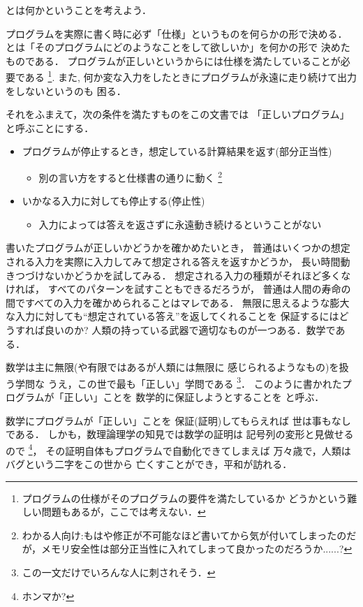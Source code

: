 \documentclass[a4paper, 10pt]{ltjsarticle}
\begin{document}
 とは何かということを考えよう． 

 プログラムを実際に書く時に必ず「仕様」というものを何らかの形で決める．
 とは「そのプログラムにどのようなことをして欲しいか」を何かの形で
 決めたものである．
 プログラムが正しいというからには仕様を満たしていることが必要である
 \footnote{プログラムの仕様がそのプログラムの要件を満たしているか
 どうかという難しい問題もあるが，ここでは考えない．}.
 また, 何か変な入力をしたときにプログラムが永遠に走り続けて出力をしないというのも
 困る．

 それをふまえて，次の条件を満たすものをこの文書では
 「正しいプログラム」と呼ぶことにする．
 
 \begin{itemize}
  \item プログラムが停止するとき，想定している計算結果を返す(部分正当性)
 	\begin{itemize}
 	 \item 別の言い方をすると仕様書の通りに動く
	       \footnote{わかる人向け:もはや修正が不可能なほど書いてから気が付いてしまったのだが，メモリ安全性は部分正当性に入れてしまって良かったのだろうか......?}
 	\end{itemize}
  \item いかなる入力に対しても停止する(停止性)
 	\begin{itemize}
 	 \item 入力によっては答えを返さずに永遠動き続けるということがない
 	\end{itemize}
 \end{itemize}

 書いたプログラムが正しいかどうかを確かめたいとき，
 普通はいくつかの想定される入力を実際に入力してみて想定される答えを返すかどうか，
 長い時間動きつづけないかどうかを試してみる．
 想定される入力の種類がそれほど多くなければ，
 すべてのパターンを試すこともできるだろうが，
 普通は人間の寿命の間ですべての入力を確かめられることはマレである．
 無限に思えるような膨大な入力に対しても``想定されている答え''を返してくれることを
 保証するにはどうすれば良いのか? 
 人類の持っている武器で適切なものが一つある．数学である．

 数学は主に無限(や有限ではあるが人類には無限に
 感じられるようなもの)を扱う学問な
 うえ，この世で最も「正しい」学問である
 \footnote{この一文だけでいろんな人に刺されそう．}．
 このように書かれたプログラムが「正しい」ことを
 数学的に保証しようとすることを
 と呼ぶ．
 
 数学にプログラムが「正しい」ことを
 保証(証明)してもらえれば
 世は事もなしである．
 しかも，数理論理学の知見では数学の証明は
 記号列の変形と見做せるので
 \footnote{ホンマか?}，
 その証明自体もプログラムで自動化できてしまえば
 万々歳で，人類はバグという二字をこの世から
 亡くすことができ，平和が訪れる．
\end{document}
